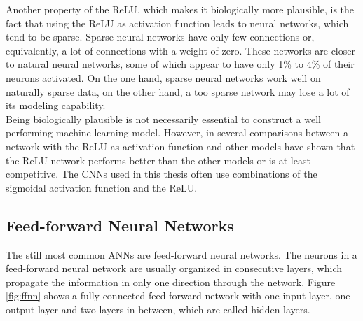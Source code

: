 \documentclass[11pt, a4paper]{article}
\begin{document}
Another property of the \ac{ReLU}, which makes it biologically more plausible, is the fact that using the \ac{ReLU} as activation function leads to neural networks, which tend to be sparse. Sparse neural networks have only few connections or, equivalently, a lot of connections with a weight of zero. These networks are closer to natural neural networks, some of which appear to have only 1\% to 4\% of their neurons activated. On the one hand, sparse neural networks work well on naturally sparse data, on the other hand, a too sparse network may lose a lot of its modeling capability.\\
Being biologically plausible is not necessarily essential to construct a well performing machine learning model. However, in \cite{dsrnn} several comparisons between a network with the \ac{ReLU} as activation function and other models have shown that the \ac{ReLU} network performs better than the other models or is at least competitive. The \acp{CNN} used in this thesis often use combinations of the sigmoidal activation function and the \ac{ReLU}.

\subsection{Feed-forward Neural Networks}
\label{subsec:feed_forward_neural_networks}

The still most common \acp{ANN} are feed-forward neural networks. The neurons in a feed-forward neural network are usually organized in consecutive layers, which propagate the information in only one direction through the network. Figure \ref{fig:ffnn} shows a fully connected feed-forward network with one input layer, one output layer and two layers in between, which are called hidden layers.

\end{document}
